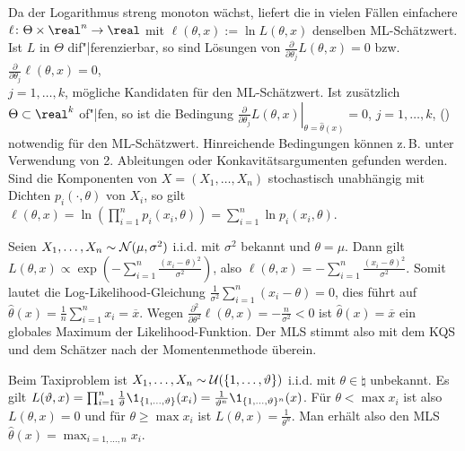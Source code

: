 \begin{Bem}
    Da der Logarithmus streng monoton wächst, liefert die in vielen Fällen einfachere
     $\ell\colon \Theta \times \real^n \rightarrow \real$ mit
    $\ell(\theta, x) := \ln L(\theta, x)$ denselben ML-Schätzwert.\\
    Ist $L$ in $\Theta$ dif"|ferenzierbar, so sind Lösungen von
    $\frac{\partial}{\partial \theta_j} L(\theta, x) = 0$ bzw.
    $\frac{\partial}{\partial \theta_j} \ell(\theta, x) = 0$,\\
    $j = 1, \dotsc, k$, mögliche Kandidaten für den ML-Schätzwert.
    Ist zusätzlich $\Theta \subset \real^k$ of"|fen, so ist die Bedingung
    $\left.\frac{\partial}{\partial \theta_j}
    L(\theta, x)\right|_{\theta=\widehat{\theta}(x)} = 0$,
    $j = 1, \dotsc, k$, ()
    notwendig für den ML-Schätzwert.
    Hinreichende Bedingungen können z.\,B. unter Verwendung von 2. Ableitungen oder
    Konkavitätsargumenten gefunden werden.\\
    Sind die Komponenten von $X = (X_1, \dotsc, X_n)$ stochastisch unabhängig mit Dichten
    $p_i(\cdot, \theta)$ von $X_i$, so gilt $\ell(\theta, x) =
    \ln\!\left(\prod_{i=1}^n p_i(x_i, \theta)\right) = \sum_{i=1}^n \ln p_i(x_i, \theta)$.
\end{Bem}

\linie

\begin{Bsp}
    Seien $X_1, \dotsc, X_n \sim \mathcal{N}(\mu, \sigma^2)$ i.i.d. mit $\sigma^2$ bekannt und
    $\theta = \mu$.
    Dann gilt $L(\theta, x) \propto
    \exp\!\left(-\sum_{i=1}^n \frac{(x_i - \theta)^2}{\sigma^2}\right)$, also
    $\ell(\theta, x) = -\sum_{i=1}^n \frac{(x_i - \theta)^2}{\sigma^2}$.
    Somit lautet die Log-Likelihood-Gleichung
    $\frac{1}{\sigma^2} \sum_{i=1}^n (x_i - \theta) = 0$,
    dies führt auf $\widehat{\theta}(x) = \frac{1}{n} \sum_{i=1}^n x_i = \overline{x}$.
    Wegen $\frac{\partial^2}{\partial \theta^2} \ell(\theta, x) = -\frac{n}{\sigma^2} < 0$
    ist $\widehat{\theta}(x) = \overline{x}$ ein globales Maximum der Likelihood-Funktion.
    Der MLS stimmt also mit dem KQS und dem Schätzer nach der Momentenmethode überein.
\end{Bsp}

\begin{Bsp}
    Beim Taxiproblem ist $X_1, \dotsc, X_n \sim \mathcal{U}(\{1, \dotsc, \vartheta\})$ i.i.d. mit
    $\theta \in \natural$ unbekannt.
    Es gilt $L(\theta, x) = \prod_{i=1}^n \frac{1}{\theta} \1_{\{1, \dotsc, \theta\}}(x_i) =
    \frac{1}{\theta^n} \1_{\{1, \dotsc, \theta\}^n}(x)$.
    Für $\theta < \max x_i$ ist also $L(\theta, x) = 0$ und für $\theta \ge \max x_i$ ist
    $L(\theta, x) = \frac{1}{\theta^n}$.
    Man erhält also den MLS $\widehat{\theta}(x) = \max_{i=1,\dotsc,n} x_i$.
\end{Bsp}

